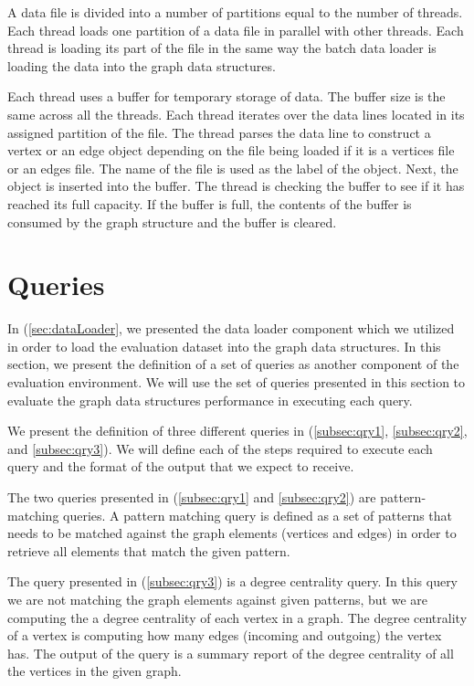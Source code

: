 {A data file is divided into a number of partitions equal to the number of threads. Each thread loads one partition of a data file in parallel with other threads. Each thread is loading its part of the file in the same way the batch data loader is loading the data into the graph data structures. 

Each thread uses a buffer for temporary storage of data. The buffer size is the same across all the threads. Each thread iterates over the data lines located in its assigned partition of the file. The thread parses the data line to construct a vertex or an edge object depending on the file being loaded if it is a vertices file or an edges file. The name of the file is used as the label of the object. Next, the object is inserted into the buffer. The thread is checking the buffer to see if it has reached its full capacity. If the buffer is full, the contents of the buffer is consumed by the graph structure and the buffer is cleared.

\section{Queries}
\label{sec:qryDef}

In (\ref{sec:dataLoader}, we presented the data loader component which we utilized in order to load the evaluation dataset into the graph data structures. In this section, we present the definition of a set of queries as another component of the evaluation environment. We will use the set of queries presented in this section to evaluate the graph data structures performance in executing each query. 

We present the definition of three different queries in (\ref{subsec:qry1}, \ref{subsec:qry2}, and \ref{subsec:qry3}). We will define each of the steps required to execute each query and the format of the output that we expect to receive.

The two queries presented in (\ref{subsec:qry1} and \ref{subsec:qry2}) are pattern-matching queries. A pattern matching query is defined as a set of patterns that needs to be matched against the graph elements (vertices and edges) in order to retrieve all elements that match the given pattern.

The query presented in (\ref{subsec:qry3}) is a degree centrality query. In this query we are not matching the graph elements against given patterns, but we are computing the a degree centrality of each vertex in a graph. The degree centrality of a vertex is computing how many edges (incoming and outgoing) the vertex has. The output of the query is a summary report of the degree centrality of all the vertices in the given graph.

}
